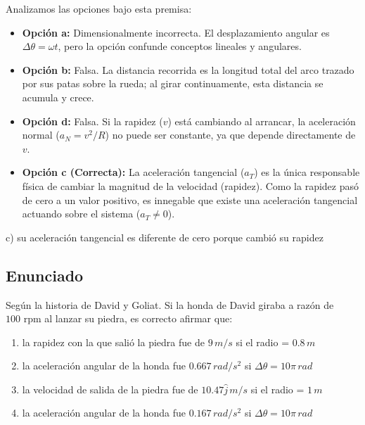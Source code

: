 \documentclass[12pt, a4paper]{article}
\begin{document}
Analizamos las opciones bajo esta premisa:
\begin{itemize}
    \item \textbf{Opción a:} Dimensionalmente incorrecta. El desplazamiento angular es $\Delta\theta = \omega t$, pero la opción confunde conceptos lineales y angulares.
    \item \textbf{Opción b:} Falsa. La distancia recorrida es la longitud total del arco trazado por sus patas sobre la rueda; al girar continuamente, esta distancia se acumula y crece.
    \item \textbf{Opción d:} Falsa. Si la rapidez ($v$) está cambiando al arrancar, la aceleración normal ($a_N = v^2/R$) no puede ser constante, ya que depende directamente de $v$.
    \item \textbf{Opción c (Correcta):} La aceleración tangencial ($a_T$) es la única responsable física de cambiar la magnitud de la velocidad (rapidez). Como la rapidez pasó de cero a un valor positivo, es innegable que existe una aceleración tangencial actuando sobre el sistema ($a_T \neq 0$).
\end{itemize}

\begin{tcolorbox}[colback=green!5!white, colframe=green!50!black, title=Respuesta Final]
\centering \Large c) su aceleración tangencial es diferente de cero porque cambió su rapidez
\end{tcolorbox}

\newpage

\subsection*{Enunciado}
Según la historia de David y Goliat. Si la honda de David giraba a razón de $100\text{ rpm}$ al lanzar su piedra, es correcto afirmar que:
\begin{enumerate}[label=\alph*)]
    \item la rapidez con la que salió la piedra fue de $9\,\si{m/s}$ si el radio = $0.8\,\si{m}$
    \item la aceleración angular de la honda fue $0.667\,\si{rad/s^2}$ si $\Delta\theta = 10\pi\,\si{rad}$
    \item la velocidad de salida de la piedra fue de $10.47\hat{j}\,\si{m/s}$ si el radio = $1\,\si{m}$
    \item la aceleración angular de la honda fue $0.167\,\si{rad/s^2}$ si $\Delta\theta = 10\pi\,\si{rad}$
\end{enumerate}
\end{document}
